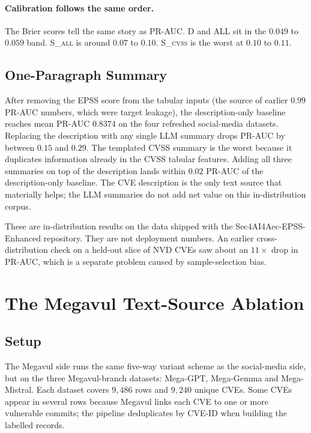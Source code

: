 \documentclass[11pt]{article}
\begin{document}
\paragraph{Calibration follows the same order.}
The Brier scores tell the same story as PR-AUC. \textsc{D} and
\textsc{ALL} sit in the $0.049$ to $0.059$ band. \textsc{S\_all} is
around $0.07$ to $0.10$. \textsc{S\_cvss} is the worst at $0.10$ to
$0.11$.

\subsection{One-Paragraph Summary}

After removing the EPSS score from the tabular inputs (the source of
earlier $0.99$ PR-AUC numbers, which were target leakage), the
description-only baseline reaches mean PR-AUC $0.8374$ on the four
refreshed social-media datasets. Replacing the description with any
single LLM summary drops PR-AUC by between $0.15$ and $0.29$. The
templated CVSS summary is the worst because it duplicates information
already in the CVSS tabular features. Adding all three summaries on
top of the description lands within $0.02$ PR-AUC of the
description-only baseline. The CVE description is the only text source
that materially helps; the LLM summaries do not add net value on this
in-distribution corpus.

These are in-distribution results on the data shipped with the
Sec4AI4Aec-EPSS-Enhanced repository. They are not deployment numbers.
An earlier cross-distribution check on a held-out slice of NVD CVEs
saw about an $11\times$ drop in PR-AUC, which is a separate problem
caused by sample-selection bias.

\section{The Megavul Text-Source Ablation}

\subsection{Setup}

The Megavul side runs the same five-way variant scheme as the
social-media side, but on the three Megavul-branch datasets:
Mega-GPT, Mega-Gemma and Mega-Mistral. Each dataset covers $9{,}486$
rows and $9{,}240$ unique CVEs. Some CVEs appear in several rows
because Megavul links each CVE to one or more vulnerable commits;
the pipeline deduplicates by CVE-ID when building the labelled
records.
\end{document}
